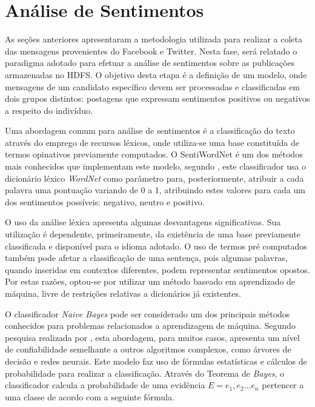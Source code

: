\section{Análise de Sentimentos}

As seções anteriores apresentaram a metodologia utilizada para realizar a coleta das mensagens provenientes do Facebook e Twitter. Nesta fase, será relatado o paradigma adotado para efetuar a análise de sentimentos sobre as publicações armazenadas no HDFS. O objetivo desta etapa é a definição de um modelo, onde mensagens de um candidato específico devem ser processadas e classificadas em dois grupos distintos: postagens que expressam sentimentos positivos ou negativos a respeito do indivíduo.

Uma abordagem comum para análise de sentimentos é a classificação do texto através do emprego de recursos léxicos, onde utiliza-se uma base constituída de termos opinativos previamente computados. O SentiWordNet é um dos métodos mais conhecidos que implementam este modelo, segundo , este classificador usa o dicionário léxico \textit{WordNet} como parâmetro para, posteriormente, atribuir a cada palavra uma pontuação variando de 0 a 1, atribuindo estes valores para cada um dos sentimentos possíveis: negativo, neutro e positivo.

O uso da análise léxica apresenta algumas desvantagens significativas. Sua utilização é dependente, primeiramente, da existência de uma base previamente classificada e disponível para o idioma adotado. O uso de termos pré computados também pode afetar a classificação de uma sentença, pois algumas palavras, quando inseridas em contextos diferentes, podem representar sentimentos opostos. Por estas razões, optou-se por utilizar um método baseado em aprendizado de máquina, livre de restrições relativas a dicionários já existentes.

O classificador \textit{Naive Bayes} pode ser considerado um dos principais métodos conhecidos para problemas relacionados a aprendizagem de máquina. Segundo pesquisa realizada por , esta abordagem, para muitos casos, apresenta um nível de confiabilidade semelhante a outros algoritmos complexos, como árvores de decisão e redes neurais. Este modelo faz uso de fórmulas estatísticas e cálculos de probabilidade para realizar a classificação. Através do Teorema de \textit{Bayes}, o classificador calcula a probabilidade de uma evidência $E = e_{1}, e_{2} … e_{n}$ pertencer a uma classe de acordo com a seguinte fórmula.

